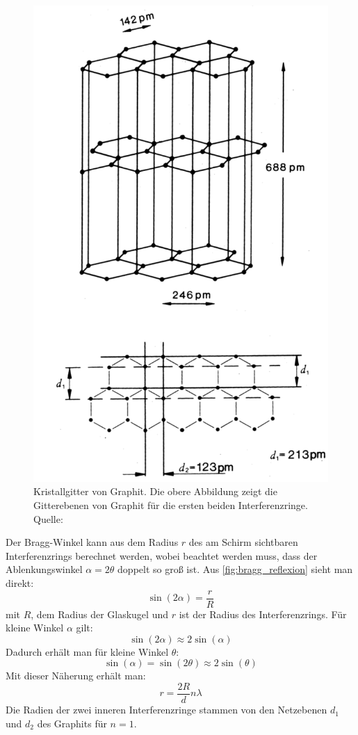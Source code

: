 \documentclass[ngerman]{scrartcl}
\begin{document}
\begin{figure}[H]
    \centering
    \begin{samepage}
        \includegraphics[width=0.6\linewidth]{fig/graphitgitter.png}
        \caption[Graphitkristallgitter]{Kristallgitter von Graphit. Die obere Abbildung zeigt die Gitterebenen von Graphit für die ersten beiden Interferenzringe. Quelle: \cite{ref:angabe_elektronen}}
        \label{fig:graphitgitter}
    \end{samepage}
\end{figure}
%
Der Bragg-Winkel kann aus dem Radius $r$ des am Schirm sichtbaren Interferenzrings berechnet werden, wobei beachtet werden muss, dass der Ablenkungswinkel $\alpha = 2\theta$ doppelt so groß ist. Aus \autoref{fig:bragg_reflexion} sieht man direkt:
%
\begin{equation}
    \label{eq:ablenkwinkel_radius}
    \sin(2\alpha) = \frac{r}{R}
\end{equation}
%
mit $R$, dem Radius der Glaskugel und $r$ ist der Radius des Interferenzrings. Für kleine Winkel $\alpha$ gilt:
%
\[\sin(2\alpha) \approx 2\sin(\alpha)\]
%
Dadurch erhält man für kleine Winkel $\theta$:
%
\[\sin(\alpha)=\sin(2\theta)\approx2\sin(\theta)\]
%
Mit dieser Näherung erhält man:
%
\begin{equation}
    \label{eq:radius_wellenlaenge}
    r=\frac{2R}{d}n\lambda
\end{equation}
%
Die Radien der zwei inneren Interferenzringe stammen von den Netzebenen $d_1$ und $d_2$ des Graphits für $n=1$.
\end{document}

